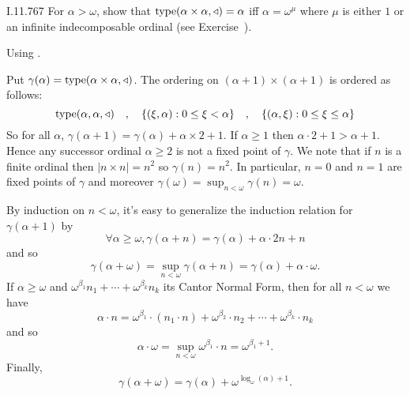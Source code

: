 \begin{lexcopy}{I.11.7}{67}
For \(\alpha > \omega\), show that
\(\mathop{\mathrm{type}}(\alpha \times \alpha, \triangleleft) = \alpha\) iff
\(\alpha = \omega^\mu\) where
\(\mu\) is either $1$ or an infinite indecomposable ordinal
(see Exercise~).
\end{lexcopy}

Using \cite{WangFrederic}.

Put \(\gamma(\alpha) = \mathop{\mathrm{type}}(\alpha \times \alpha, \triangleleft)\).
The ordering on \((\alpha+1)\times(\alpha+1)\) is ordered as follows:
\begin{equation*}
\mathop{\mathrm{type}}(\alpha, \alpha, \triangleleft)
\quad,\quad \{(\xi,\alpha): 0\leq\xi<\alpha\}
\quad,\quad \{(\alpha,\xi): 0\leq\xi\leq\alpha\}
\end{equation*}
So for all \(\alpha\),
\(\gamma(\alpha+1) = \gamma(\alpha) + \alpha\times 2 + 1\).
If \(\alpha \geq 1\) then \(\alpha\cdot ⁢2+1 > \alpha+1\).
Hence any successor ordinal \(\alpha \geq 2\)
is not a fixed point of \(\gamma\).
We note that if $n$ is a finite ordinal then \(|n\times n| = n^2\)
so \(\gamma⁢(n) = n^2\).
In particular, \(n=0\) and \(n=1\) are fixed points of \(\gamma\)
and moreover \(\gamma⁢(\omega) = \sup_{n<\omega⁡}\gamma⁢(n) = \omega\).

By induction on \(n < \omega\), it’s easy to generalize the induction relation
for \(\gamma⁢(\alpha+1)\) by
\begin{equation*}
\forall \alpha \geq \omega, \gamma⁢(\alpha+n)=\gamma⁢(\alpha)+\alpha⋅2⁢n+n
\end{equation*}
and so
\begin{equation*}
\gamma⁢(\alpha + \omega) = \sup_{n<\omega⁡}\gamma⁢(\alpha + n) =
\gamma⁢(\alpha) + \alpha⋅\omega.
\end{equation*}
If \(\alpha \geq \omega\) and
\(\omega^{\beta_1}⁢ n_1 + \cdots + \omega^{\beta_k}⁢ n_k\)
its Cantor
Normal Form, then for all \(n < \omega\)
we have
\begin{equation*}
\alpha \cdot n =
 \omega^{\beta_1⁢}\cdot (n_1\cdot⁢ n) + \omega^{\beta_2}⁢\cdot n_2 + \cdots +
   \omega^{\beta_k}⁢\cdot n_k
\end{equation*}
and
so
\begin{equation*}
\alpha \cdot \omega = \sup_{n<\omega}⁡\omega^{\beta_1} \cdot n = \omega^{\beta_1 + 1}.
\end{equation*}
Finally,
\begin{equation*}
\gamma⁢(\alpha + \omega)=\gamma⁢(\alpha) + \omega^{\log_\omega⁡(\alpha) + 1}.
\end{equation*}

